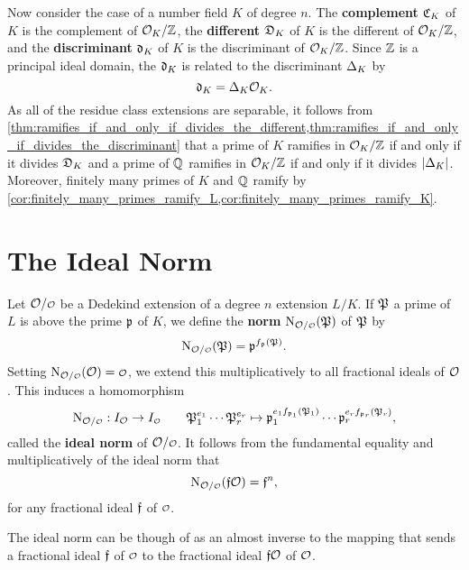     Now consider the case of a number field $K$ of degree $n$. The \textbf{complement} $\mathfrak{C}_{K}$ of $K$ is the complement of $\mathcal{O}_{K}/\mathbb{Z}$, the \textbf{different} $\mathfrak{D}_{K}$ of $K$ is the different of $\mathcal{O}_{K}/\mathbb{Z}$, and the \textbf{discriminant} $\mathfrak{d}_{K}$ of $K$ is the discriminant of $\mathcal{O}_{K}/\mathbb{Z}$. Since $\mathbb{Z}$ is a principal ideal domain, the $\mathfrak{d}_{K}$ is related to the discriminant $\Delta_{K}$ by
    \[
      \mathfrak{d}_{K} = \Delta_{K}\mathcal{O}_{K}.
    \]
    As all of the residue class extensions are separable, it follows from \cref{thm:ramifies_if_and_only_if_divides_the_different,thm:ramifies_if_and_only_if_divides_the_discriminant} that a prime of $K$ ramifies in $\mathcal{O}_{K}/\mathbb{Z}$ if and only if it divides $\mathfrak{D}_{K}$ and a prime of $\mathbb{Q}$ ramifies in $\mathcal{O}_{K}/\mathbb{Z}$ if and only if it divides $|\Delta_{K}|$. Moreover, finitely many primes of $K$ and $\mathbb{Q}$ ramify by \cref{cor:finitely_many_primes_ramify_L,cor:finitely_many_primes_ramify_K}.
  \section{The Ideal Norm}
    Let $\mc{O}/\smc{O}$ be a Dedekind extension of a degree $n$ extension $L/K$. If $\mathfrak{P}$ a prime of $L$ is above the prime $\mathfrak{p}$ of $K$, we define the \textbf{norm} $\Norm_{\mc{O}/\smc{O}}(\mf{P})$ of $\mathfrak{P}$ by
    \[
      \Norm_{\mc{O}/\smc{O}}(\mf{P}) = \mf{p}^{f_{\mf{p}}(\mf{P})}.
    \]
    Setting $\Norm_{\mc{O}/\smc{O}}(\mc{O}) = \smc{O}$, we extend this multiplicatively to all fractional ideals of $\mathcal{O}$. This induces a homomorphism
    \[
      \Norm_{\mc{O}/\smc{O}}:I_{\mc{O}} \to I_{\smc{O}} \qquad \mf{P}_{1}^{e_{1}} \cdots \mf{P}_{r}^{e_{r}} \mapsto \mf{p}_{1}^{e_{1}f_{\mf{p}_{1}}(\mf{P}_{1})} \cdots \mf{p}_{r}^{e_{r}f_{\mf{p}_{r}}(\mf{P}_{r})},
    \]
    called the \textbf{ideal norm} of $\mc{O}/\smc{O}$. It follows from the fundamental equality and multiplicatively of the ideal norm that
    \[
      \Norm_{\mc{O}/\smc{O}}(\mf{f}\mc{O}) = \mf{f}^{n},
    \]
    for any fractional ideal $\mathfrak{f}$ of $\smc{O}$. 

    \begin{remark}
      The ideal norm can be though of as an almost inverse to the mapping that sends a fractional ideal $\mathfrak{f}$ of $\smc{O}$ to the fractional ideal $\mathfrak{f}\mathcal{O}$ of $\mathcal{O}$.
    \end{remark}


